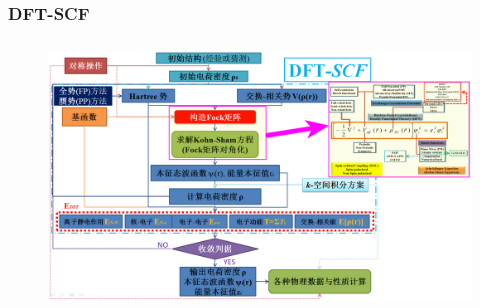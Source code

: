 \frame
{
	\frametitle{\textrm{DFT-SCF}}
\begin{figure}[h!]
\centering
\vspace*{-0.25in}
\hspace*{-0.80in}
\includegraphics[height=2.80in,width=4.95in,viewport=5 3 1490 870,clip]{Figures/DFT-SCF_2.png}
\label{DFT-SCF-2}
\end{figure}
}


